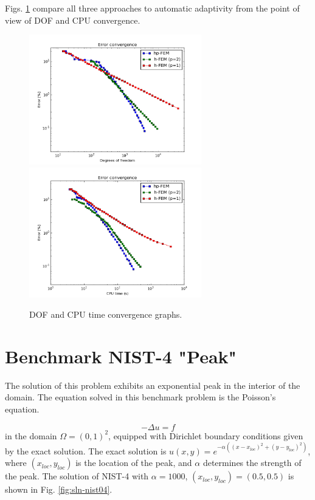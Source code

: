 \documentclass[12pt]{elsarticle}
\begin{document}
Figs. \ref{fig:nist-3-conv} compare all
three approaches to automatic adaptivity from the point
of view of DOF and CPU convergence.

\begin{figure}[H]
\centering
\hspace{-50mm}
\includegraphics[width=7.5cm]{nist/nist-3/conv_dof_aniso.png}\ \
\hspace{-10mm}
\includegraphics[width=7.5cm]{nist/nist-3/conv_cpu_aniso.png}
\hspace{-50mm}
\caption{DOF and CPU time convergence graphs.}
\label{fig:nist-3-conv}
\end{figure}


\section{Benchmark NIST-4 "Peak"}
\label{sec:bench-4}

The solution of this problem exhibits an exponential peak in the interior of the domain.
The equation solved in this benchmark problem is the Poisson's equation.

\begin{equation} \label{poisson-peak}
-\Delta u = f
\end{equation}
in the domain $\Omega = (0, 1)^2$, equipped with Dirichlet
boundary conditions given by the exact solution.
The exact solution is
$u(x,y) = e^{-\alpha ((x - x_{loc})^{2} + (y - y_{loc})^{2})}$,
where $(x_{loc}, y_{loc})$ is the location of the peak,
and $\alpha$ determines the strength of the peak.
The solution of NIST-4 with $\alpha = 1000$,
$(x_{loc}, y_{loc}) = (0.5, 0.5)$ is shown in Fig. \ref{fig:sln-nist04}.
\end{document}
